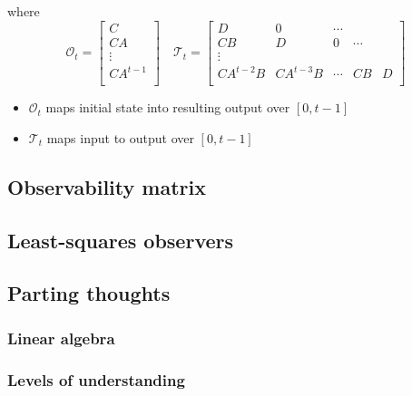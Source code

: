 \documentclass[10pt,letterpaper]{article}
\begin{document}
where
$$
\mathcal O_t =
\begin{bmatrix}
  C         \\
  CA        \\
  \vdots    \\
  CA ^{t-1} \\
\end{bmatrix}
\quad
\mathcal T _{t} =
\begin{bmatrix}
  D          & 0          & \cdots &        &   \\
  CB         & D          & 0      & \cdots &   \\
  \vdots     &            &        &        &   \\
  CA ^{t-2}B & CA ^{t-3}B & \cdots & CB     & D \\
\end{bmatrix}
$$
\begin{itemize}
\item $\mathcal O _t$ maps initial state into resulting output over $[0,t-1]$
\item $\mathcal T_t$ maps input to output over $[0,t-1]$
\end{itemize}
\subsection{Observability matrix}
\label{sec-19_3}
\subsection{Least-squares observers}
\label{sec-19_4}
\subsection{Parting thoughts}
\label{sec-19_5}
\subsubsection{Linear algebra}
\label{sec-19_5_1}
\subsubsection{Levels of understanding}
\label{sec-19_5_2}
\end{document}
